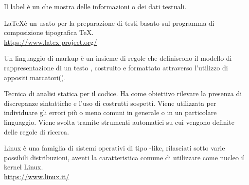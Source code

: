 Il label è un  che mostra delle informazioni o dei dati testuali.

\LaTeX è un  usato per la preparazione di testi basato sul programma di composizione tipografica \TeX.\\
\url{https://www.latex-project.org/}

Un linguaggio di markup è un insieme di regole che definiscono il modello di rappresentazione di un testo , costruito e formattato attraverso l’utilizzo di appositi marcatori().

Tecnica di analisi statica per il codice. Ha come obiettivo rilevare la presenza di discrepanze sintattiche e l’uso di costrutti sospetti. Viene utilizzata per individuare gli errori più o meno comuni in generale o in un particolare linguaggio. Viene svolta tramite strumenti automatici su cui vengono definite delle regole di ricerca.

Linux è una famiglia di sistemi operativi di tipo -like, rilasciati sotto varie possibili distribuzioni, aventi la caratteristica comune di utilizzare come nucleo il kernel Linux.\\
\url{https://www.linux.it/}
\clearpage